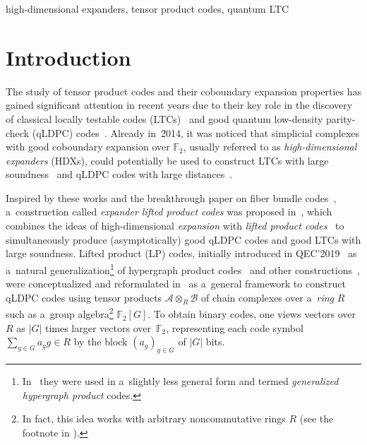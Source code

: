 \documentclass[conference]{IEEEtran}
\theoremstyle{plain}
\theoremstyle{definition}
\theoremstyle{remark}
\newcommand{\cA}{\mathcal{A}}
\newcommand{\cB}{\mathcal{B}}
\newcommand{\F}{\mathbb{F}}
\begin{document}
\begin{IEEEkeywords}
high-dimensional expanders, tensor product codes, quantum LTC
\end{IEEEkeywords}

\section{Introduction}

The study of tensor product codes and their coboundary expansion properties has gained significant attention in recent years due to their key role in the discovery of classical locally testable codes (LTCs)~\cite{Dinur:stoc2022, Panteleev&Kalachev:stoc2022} and good quantum low-density parity-check (qLDPC) codes~\cite{Panteleev&Kalachev:stoc2022}. Already in~2014, it was noticed that simplicial complexes with good coboundary expansion over $\F_2$, usually referred to as \emph{high-dimensional expanders} (HDXs), could potentially be used to construct LTCs with large soundness~\cite{Kaufman:2014a} and qLDPC codes with large distances~\cite{Kaufman:2014, Evra:2020}. 

Inspired by these works and the breakthrough paper on fiber bundle codes~\cite{Hastings:2021:fiber}, a~construction called \emph{expander lifted product codes} was proposed in~\cite{Panteleev&Kalachev:stoc2022}, which combines the ideas of high-dimensional \emph{expansion} with \emph{lifted product codes}~\cite{Panteleev&Kalachev:2019,Panteleev&Kalachev:2021} to simultaneously produce (asymptotically) good qLDPC codes and good LTCs with large soundness. 
Lifted product (LP) codes, initially introduced in QEC'2019~\cite{Panteleev&Kalachev:2019} as a~natural generalization\footnote{In~\cite{Panteleev&Kalachev:2019} they were used in a~slightly less general form and termed \emph{generalized hypergraph product} codes.} of hypergraph product codes~\cite{Tillich&Zemor:2014} and other constructions~\cite{qldpc,Hagiwara:2007,Haah:2011,Kovalev:2013}, were conceptualized and reformulated in~\cite{Panteleev&Kalachev:2021} as a~general framework to construct qLDPC codes using tensor products $\cA \otimes_R \cB$ of chain complexes over a~\emph{ring} $R$ such as a~group algebra\footnote{In fact, this idea works with arbitrary noncommutative rings $R$ (see the footnote in \cite[p.~3]{Panteleev&Kalachev:2021}).} $\F_2[G]$. To obtain binary codes, one views vectors over $R$ as $| G |$ times larger vectors over~$\mathbb{F}_2$, representing each code symbol $\sum_{g \in G} a_g g \in R$ by the block $(a_g)_{g \in G}$ of $| G |$ bits.
\end{document}
